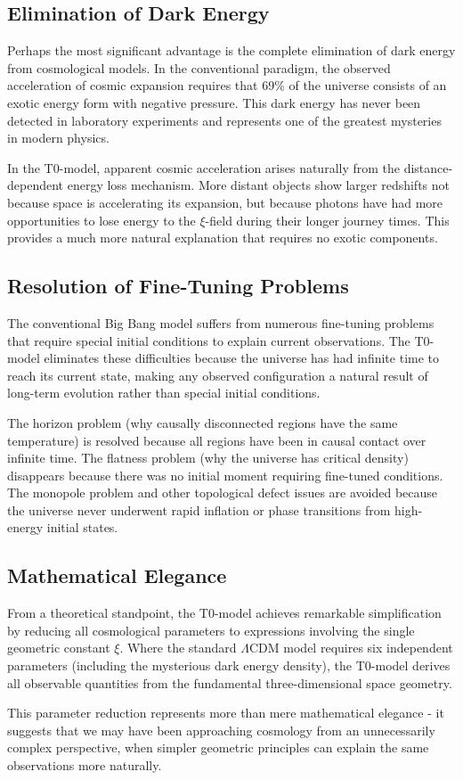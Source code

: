 \documentclass[12pt,a4paper]{report}
\begin{document}
	\subsection{Elimination of Dark Energy}
	
	Perhaps the most significant advantage is the complete elimination of dark energy from cosmological models. In the conventional paradigm, the observed acceleration of cosmic expansion requires that 69\% of the universe consists of an exotic energy form with negative pressure. This dark energy has never been detected in laboratory experiments and represents one of the greatest mysteries in modern physics.
	
	In the T0-model, apparent cosmic acceleration arises naturally from the distance-dependent energy loss mechanism. More distant objects show larger redshifts not because space is accelerating its expansion, but because photons have had more opportunities to lose energy to the $\xi$-field during their longer journey times. This provides a much more natural explanation that requires no exotic components.
	
	\subsection{Resolution of Fine-Tuning Problems}
	
	The conventional Big Bang model suffers from numerous fine-tuning problems that require special initial conditions to explain current observations. The T0-model eliminates these difficulties because the universe has had infinite time to reach its current state, making any observed configuration a natural result of long-term evolution rather than special initial conditions.
	
	The horizon problem (why causally disconnected regions have the same temperature) is resolved because all regions have been in causal contact over infinite time. The flatness problem (why the universe has critical density) disappears because there was no initial moment requiring fine-tuned conditions. The monopole problem and other topological defect issues are avoided because the universe never underwent rapid inflation or phase transitions from high-energy initial states.
	
	\subsection{Mathematical Elegance}
	
	From a theoretical standpoint, the T0-model achieves remarkable simplification by reducing all cosmological parameters to expressions involving the single geometric constant $\xi$. Where the standard $\Lambda$CDM model requires six independent parameters (including the mysterious dark energy density), the T0-model derives all observable quantities from the fundamental three-dimensional space geometry.
	
	This parameter reduction represents more than mere mathematical elegance - it suggests that we may have been approaching cosmology from an unnecessarily complex perspective, when simpler geometric principles can explain the same observations more naturally.
\end{document}
